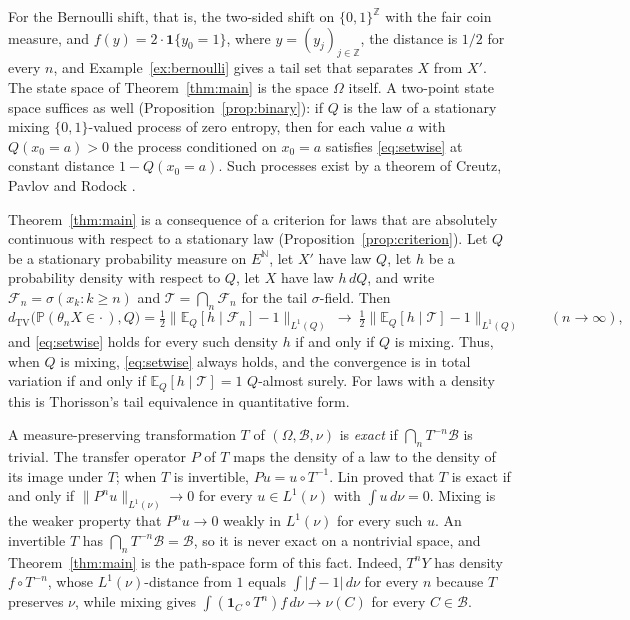 \documentclass[11pt]{amsart}
\theoremstyle{definition}
\theoremstyle{remark}
\newcommand{\N}{\mathbb N}
\newcommand{\Z}{\mathbb Z}
\newcommand{\E}{\mathbb E}
\newcommand{\Prob}{\mathbb P}
\newcommand{\cF}{\mathcal F}
\newcommand{\cB}{\mathcal B}
\newcommand{\cT}{\mathcal T}
\newcommand{\dtv}{d_{\mathrm{TV}}}
\newcommand{\one}{\mathbf 1}
\begin{document}
For the Bernoulli shift, that is, the two-sided shift on $\{0,1\}^\Z$ with the fair coin measure, and $f(y)=2\cdot\one\{y_0=1\}$, where
$y=(y_j)_{j\in\Z}$, the distance is $1/2$ for every $n$, and Example~\ref{ex:bernoulli} gives a tail set that
separates $X$ from $X'$. The state space of
Theorem~\ref{thm:main} is the space $\Omega$ itself. A two-point state space suffices as well
(Proposition~\ref{prop:binary}): if $Q$ is the law of a stationary mixing $\{0,1\}$-valued process of zero entropy, then
for each value $a$ with $Q(x_0=a)>0$ the process conditioned on $x_0=a$ satisfies \eqref{eq:setwise} at constant
distance $1-Q(x_0=a)$. Such processes exist by a theorem of Creutz, Pavlov and Rodock \cite{CPR23}.

Theorem~\ref{thm:main} is a consequence of a criterion for laws that are absolutely continuous with respect to a
stationary law (Proposition~\ref{prop:criterion}). Let $Q$ be a stationary probability measure on $E^\N$, let $X'$ have law $Q$, let $h$ be a probability
density with respect to $Q$, let $X$ have law $h\,dQ$, and write $\cF_n=\sigma(x_k:k\ge n)$ and $\cT=\bigcap_n\cF_n$ for the tail $\sigma$-field. Then
\begin{equation}\label{eq:intro-criterion}
\dtv\bigl(\Prob(\theta_nX\in\cdot\,),Q\bigr)=\tfrac12\bigl\|\E_Q[h\mid\cF_n]-1\bigr\|_{L^1(Q)}
\ \longrightarrow\ \tfrac12\bigl\|\E_Q[h\mid\cT]-1\bigr\|_{L^1(Q)}\qquad(n\to\infty),
\end{equation}
and \eqref{eq:setwise} holds for every such density $h$ if and only if $Q$ is mixing. Thus, when $Q$ is mixing,
\eqref{eq:setwise} always holds, and the convergence is in total variation if and only if $\E_Q[h\mid\cT]=1$
$Q$-almost surely. For laws with a density this is Thorisson's tail equivalence in quantitative form.

A measure-preserving transformation $T$ of $(\Omega,\cB,\nu)$ is \emph{exact} if $\bigcap_nT^{-n}\cB$ is trivial. The
transfer operator $P$ of $T$ maps the density of a law to the density of its image under $T$; when $T$ is invertible,
$Pu=u\circ T^{-1}$. Lin \cite{Lin71} proved that $T$ is exact if and only if $\|P^nu\|_{L^1(\nu)}\to0$ for every
$u\in L^1(\nu)$ with $\int u\,d\nu=0$. Mixing is the weaker property that $P^nu\to0$ weakly in $L^1(\nu)$ for every
such $u$. An invertible $T$ has $\bigcap_nT^{-n}\cB=\cB$, so it is never exact on a nontrivial space, and
Theorem~\ref{thm:main} is the path-space form of this fact. Indeed, $T^nY$ has density $f\circ T^{-n}$, whose
$L^1(\nu)$-distance from $1$ equals $\int|f-1|\,d\nu$ for every $n$ because $T$ preserves $\nu$, while mixing gives
$\int(\one_C\circ T^n)f\,d\nu\to\nu(C)$ for every $C\in\cB$.
\end{document}
